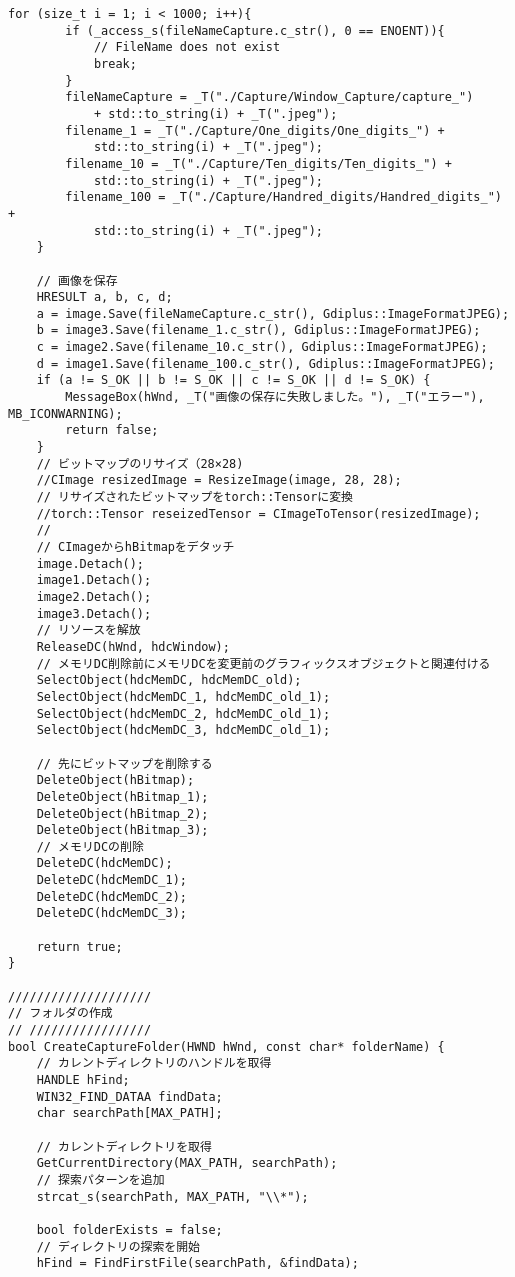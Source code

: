 \begin{lstlisting}[caption=UserInfoWindow.cpp]
	for (size_t i = 1; i < 1000; i++){
		if (_access_s(fileNameCapture.c_str(), 0 == ENOENT)){
			// FileName does not exist
			break;
		}
		fileNameCapture = _T("./Capture/Window_Capture/capture_") 
			+ std::to_string(i) + _T(".jpeg");
		filename_1 = _T("./Capture/One_digits/One_digits_") +
			std::to_string(i) + _T(".jpeg");
		filename_10 = _T("./Capture/Ten_digits/Ten_digits_") +
			std::to_string(i) + _T(".jpeg");
		filename_100 = _T("./Capture/Handred_digits/Handred_digits_") +
			std::to_string(i) + _T(".jpeg");
	}

	// 画像を保存
	HRESULT a, b, c, d;
	a = image.Save(fileNameCapture.c_str(), Gdiplus::ImageFormatJPEG);
	b = image3.Save(filename_1.c_str(), Gdiplus::ImageFormatJPEG);
	c = image2.Save(filename_10.c_str(), Gdiplus::ImageFormatJPEG);
	d = image1.Save(filename_100.c_str(), Gdiplus::ImageFormatJPEG);
	if (a != S_OK || b != S_OK || c != S_OK || d != S_OK) {
		MessageBox(hWnd, _T("画像の保存に失敗しました。"), _T("エラー"), MB_ICONWARNING);
		return false;
	}
	// ビットマップのリサイズ（28×28)
	//CImage resizedImage = ResizeImage(image, 28, 28);
	// リサイズされたビットマップをtorch::Tensorに変換
	//torch::Tensor reseizedTensor = CImageToTensor(resizedImage);
	// 
	// CImageからhBitmapをデタッチ
	image.Detach();
	image1.Detach();
	image2.Detach();
	image3.Detach();
	// リソースを解放
	ReleaseDC(hWnd, hdcWindow);
	// メモリDC削除前にメモリDCを変更前のグラフィックスオブジェクトと関連付ける
	SelectObject(hdcMemDC, hdcMemDC_old);
	SelectObject(hdcMemDC_1, hdcMemDC_old_1);
	SelectObject(hdcMemDC_2, hdcMemDC_old_1);
	SelectObject(hdcMemDC_3, hdcMemDC_old_1);

	// 先にビットマップを削除する
	DeleteObject(hBitmap);
	DeleteObject(hBitmap_1);
	DeleteObject(hBitmap_2);
	DeleteObject(hBitmap_3);
	// メモリDCの削除
	DeleteDC(hdcMemDC);
	DeleteDC(hdcMemDC_1);
	DeleteDC(hdcMemDC_2);
	DeleteDC(hdcMemDC_3);

	return true;
}

////////////////////
// フォルダの作成
// /////////////////
bool CreateCaptureFolder(HWND hWnd, const char* folderName) {
	// カレントディレクトリのハンドルを取得
	HANDLE hFind;
	WIN32_FIND_DATAA findData;
	char searchPath[MAX_PATH];

	// カレントディレクトリを取得
	GetCurrentDirectory(MAX_PATH, searchPath);
	// 探索パターンを追加
	strcat_s(searchPath, MAX_PATH, "\\*");

	bool folderExists = false;
	// ディレクトリの探索を開始
	hFind = FindFirstFile(searchPath, &findData);
	

\end{lstlisting}
